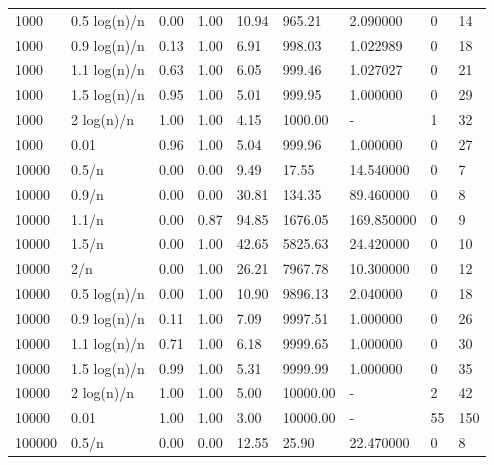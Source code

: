 \begin{table}[ht!]
\begin{tabular}{l|l|l|l|l|l|l|l|l}
	1000 &  0.5 log(n)/n &       0.00 &   1.00 &     10.94 &     965.21 &    2.090000 &       0 &      14 \\
	1000 &  0.9 log(n)/n &       0.13 &   1.00 &      6.91 &     998.03 &    1.022989 &       0 &      18 \\
	1000 &  1.1 log(n)/n &       0.63 &   1.00 &      6.05 &     999.46 &    1.027027 &       0 &      21 \\
	1000 &  1.5 log(n)/n &       0.95 &   1.00 &      5.01 &     999.95 &    1.000000 &       0 &      29 \\
	1000 &    2 log(n)/n &       1.00 &   1.00 &      4.15 &    1000.00 &         - &       1 &      32 \\
	1000 &          0.01 &       0.96 &   1.00 &      5.04 &     999.96 &    1.000000 &       0 &      27 \\
	10000 &         0.5/n &       0.00 &   0.00 &      9.49 &      17.55 &   14.540000 &       0 &       7 \\
	10000 &         0.9/n &       0.00 &   0.00 &     30.81 &     134.35 &   89.460000 &       0 &       8 \\
	10000 &         1.1/n &       0.00 &   0.87 &     94.85 &    1676.05 &  169.850000 &       0 &       9 \\
	10000 &         1.5/n &       0.00 &   1.00 &     42.65 &    5825.63 &   24.420000 &       0 &      10 \\
	10000 &           2/n &       0.00 &   1.00 &     26.21 &    7967.78 &   10.300000 &       0 &      12 \\
	10000 &  0.5 log(n)/n &       0.00 &   1.00 &     10.90 &    9896.13 &    2.040000 &       0 &      18 \\
	10000 &  0.9 log(n)/n &       0.11 &   1.00 &      7.09 &    9997.51 &    1.000000 &       0 &      26 \\
	10000 &  1.1 log(n)/n &       0.71 &   1.00 &      6.18 &    9999.65 &    1.000000 &       0 &      30 \\
	10000 &  1.5 log(n)/n &       0.99 &   1.00 &      5.31 &    9999.99 &    1.000000 &       0 &      35 \\
	10000 &    2 log(n)/n &       1.00 &   1.00 &      5.00 &   10000.00 &         - &       2 &      42 \\
	10000 &          0.01 &       1.00 &   1.00 &      3.00 &   10000.00 &         - &      55 &     150 \\
	100000 &         0.5/n &       0.00 &   0.00 &     12.55 &      25.90 &   22.470000 &       0 &       8 \\

\end{tabular}
\end{table}
